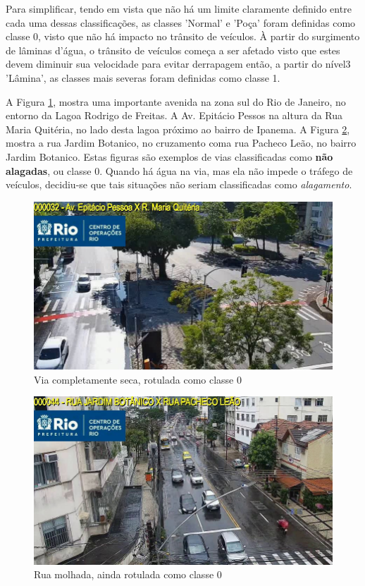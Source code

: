 
Para simplificar, tendo em vista que não há um limite claramente definido entre cada uma dessas classificações, as classes 'Normal' e 'Poça' foram definidas como classe 0, 
visto que não há impacto no trânsito de veículos. À partir do surgimento de lâminas d'água, 
o trânsito de veículos começa a ser afetado visto que estes devem diminuir sua velocidade para evitar derrapagem \cite{michelinaquaplaning} então, a partir do nível3 'Lâmina', 
as classes mais severas foram definidas como classe 1.

A Figura \ref{fig:class0_1}, mostra uma importante avenida na zona sul do Rio de Janeiro, no entorno da Lagoa Rodrigo de Freitas. 
A Av. Epitácio Pessos na altura da Rua Maria Quitéria, no lado desta lagoa próximo ao bairro de Ipanema. 
A Figura \ref{fig:class0_2}, mostra a rua Jardim Botanico, no cruzamento coma rua Pacheco Leão, no bairro Jardim Botanico.
Estas figuras são exemplos de vias classificadas como \textbf{não alagadas}, ou classe 0. 
Quando há água na via, mas ela não impede o tráfego de veículos, decidiu-se que tais situações não seriam classificadas como \textit{alagamento}.

\begin{figure}[htb]
\centerline{\includegraphics[width=0.8\linewidth]{images/0/CODE32 2023-02-22 08-15-04-6.jpg}}
\caption{Via completamente seca, rotulada como classe 0}
\label{fig:class0_1}
\end{figure}

\begin{figure}[htb]
\centerline{\includegraphics[width=0.8\linewidth]{images/0/CODE44 2023-08-20 13-30-31-6.jpg}}
\caption{Rua molhada, ainda rotulada como classe 0}
\label{fig:class0_2}
\end{figure}

